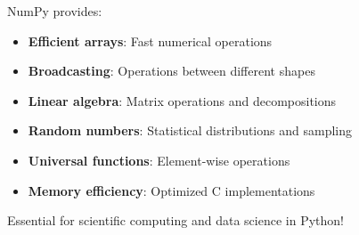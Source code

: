 \documentclass[12pt,a4paper]{article}
\begin{document}
NumPy provides:
\begin{itemize}
    \item \textbf{Efficient arrays}: Fast numerical operations
    \item \textbf{Broadcasting}: Operations between different shapes
    \item \textbf{Linear algebra}: Matrix operations and decompositions
    \item \textbf{Random numbers}: Statistical distributions and sampling
    \item \textbf{Universal functions}: Element-wise operations
    \item \textbf{Memory efficiency}: Optimized C implementations
\end{itemize}

Essential for scientific computing and data science in Python!
\end{document}
